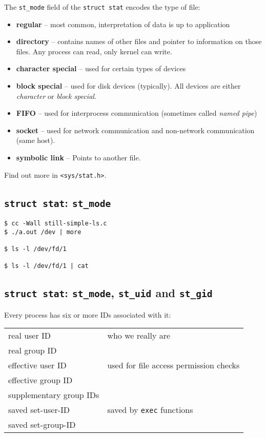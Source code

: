 \documentclass[xga]{xdvislides}
\begin{document}
The {\tt st\_mode} field of the {\tt struct stat} encodes the type of file:

\begin{itemize}
	\item {\bf regular} -- most common, interpretation of data is up to
		application
	\item {\bf directory} -- contains names of other files and pointer to
		information on those files. Any process can read, only kernel
		can write.
	\item {\bf character special} -- used for certain types of devices
	\item {\bf block special} -- used for disk devices (typically). All
		devices are either {\em character} or {\em block special}.
	\item {\bf FIFO} -- used for interprocess communication
		(sometimes called {\em named pipe})
	\item {\bf socket} -- used for network communication and non-network
		communication (same host).
	\item {\bf symbolic link} -- Points to another file.
\end{itemize}
\vspace{.25in}
Find out more in {\tt <sys/stat.h>}.

\subsection{{\tt struct stat}: {\tt st\_mode}}
\begin{verbatim}
$ cc -Wall still-simple-ls.c
$ ./a.out /dev | more

$ ls -l /dev/fd/1

$ ls -l /dev/fd/1 | cat
\end{verbatim}

\subsection{{\tt struct stat}: {\tt st\_mode}, {\tt st\_uid} and {\tt st\_gid}}
Every process has six or more IDs associated with it:
\\

\begin{tabular}{| l | l |}
	\hline
	real user ID & who we really are \\
	real group ID & \\
	\hline
	effective user ID & used for file access permission checks \\
	effective group ID & \\
	supplementary group IDs & \\
	\hline
	saved set-user-ID & saved by {\tt exec} functions \\
	saved set-group-ID & \\
	\hline
\end{tabular}
\vspace{.25in}
\end{document}
